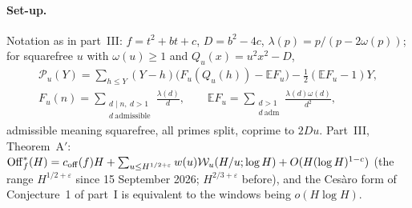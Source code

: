 \documentclass[11pt,a4paper]{article}
\theoremstyle{remark}\newtheorem{remark}[theorem]{Remark}
\begin{document}
\paragraph{Set-up.} Notation as in part~III: $f=t^2+bt+c$, $D=b^2-4c$, $\lambda(p)=p/(p-2\omega(p))$; for squarefree
$u$ with $\omega(u)\ge1$ and $Q_u(x)=u^2x^2-D$,
\[
\begin{gathered}
\mathcal P_u(Y)=\sum_{h\le Y}(Y-h)\bigl(F_u(Q_u(h))-\mathbb EF_u\bigr)-\tfrac12(\mathbb EF_u-1)Y,\\
F_u(n)=\sum_{\substack{d\mid n,\ d>1\\ d\ \mathrm{admissible}}}\frac{\lambda(d)}d,\qquad \mathbb EF_u=\sum_{\substack{d>1\\ d\ \mathrm{adm}}}\frac{\lambda(d)\omega(d)}{d^2},
\end{gathered}
\]
admissible meaning squarefree, all primes split, coprime to $2Du$. Part~III, Theorem~A$'$:
$\mathrm{Off}^\ast_f(H)=c_{\mathrm{off}}(f)H+\sum_{u\le H^{1/2+\varepsilon}}w(u)\mathcal W_u(H/u;\log H)+O(H(\log H)^{1-c})$ (the range $H^{1/2+\varepsilon}$ since 15 September 2026; $H^{2/3+\varepsilon}$ before), and the
Ces\`aro form of Conjecture~1 of part~I is equivalent to the windows being $o(H\log H)$.
\end{document}
